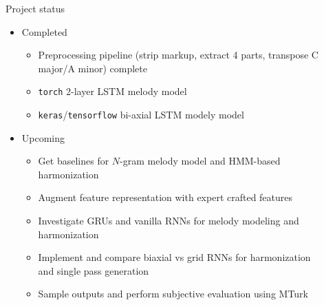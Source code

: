 \documentclass[final]{beamer}
\newlength{\sepwid}
\newlength{\onecolwid}
\newlength{\twocolwid}
\begin{document}
\begin{frame}[t]
\begin{columns}[t]
\begin{column}{\twocolwid}
\begin{columns}[t,totalwidth=\twocolwid]
\begin{column}{\onecolwid}
\end{column} %

\end{columns} %

\end{column} %

\begin{column}{\sepwid}\end{column} %

\begin{column}{\onecolwid} %


\begin{block}{Project status}

  \begin{itemize}
    \item Completed
      \begin{itemize}
        \item Preprocessing pipeline (strip markup, extract 4 parts, transpose C major/A minor) complete
        \item \texttt{torch} 2-layer LSTM melody model
        \item \texttt{keras}/\texttt{tensorflow} bi-axial LSTM modely model
      \end{itemize}
    \item Upcoming
      \begin{itemize}
        \item Get baselines for $N$-gram melody model and HMM-based harmonization \cite{allan2005harmonising}
        \item Augment feature representation with expert crafted features
        \item Investigate GRUs and vanilla RNNs for melody modeling and harmonization
        \item Implement and compare biaxial vs grid RNNs for harmonization and single pass generation
        \item Sample outputs and perform subjective evaluation using MTurk
      \end{itemize}
  \end{itemize}

\end{block}


\end{column}
\end{columns}
\end{frame}
\end{document}
